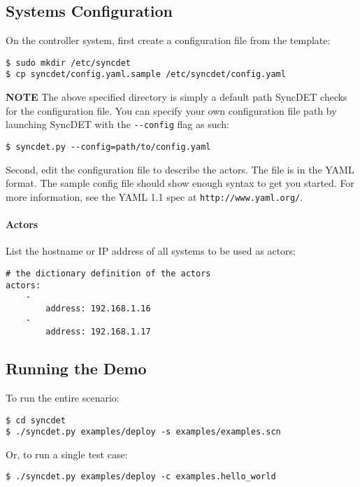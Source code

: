 \subsection{Systems Configuration}
On the controller system, first create a configuration file from the template:
\begin{verbatim}
$ sudo mkdir /etc/syncdet
$ cp syncdet/config.yaml.sample /etc/syncdet/config.yaml
\end{verbatim}

\textbf{NOTE} The above specified directory is simply a default path SyncDET checks for the
configuration file. You can specify your own configuration file path
by launching SyncDET with the \verb+--config+ flag as such:
\begin{verbatim}
$ syncdet.py --config=path/to/config.yaml
\end{verbatim}

Second, edit the configuration file to describe the actors. The file is
in the YAML format. The sample config file should show enough syntax to get you started.
For more information, see the YAML 1.1 spec at \verb+http://www.yaml.org/+.

\paragraph{Actors}
List the hostname or IP address of all systems to be used as actors:
\begin{verbatim}
# the dictionary definition of the actors
actors:
    -
        address: 192.168.1.16
    -
        address: 192.168.1.17
\end{verbatim}

\subsection{Running the Demo}

To run the entire scenario:
\begin{verbatim}
$ cd syncdet
$ ./syncdet.py examples/deploy -s examples/examples.scn
\end{verbatim}

Or, to run a single test case:
\begin{verbatim}
$ ./syncdet.py examples/deploy -c examples.hello_world
\end{verbatim}
